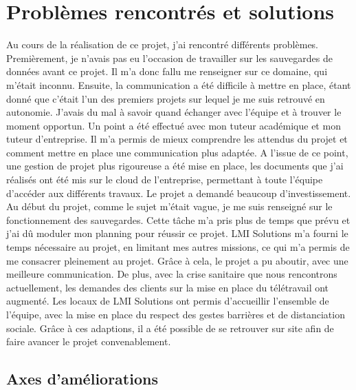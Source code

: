 \documentclass[pfe]{tnreport} %
\begin{document}
\clearpage

\chapter{Problèmes rencontrés et solutions}

Au cours de la réalisation de ce projet, j'ai rencontré différents problèmes. \newline
Premièrement, je n'avais pas eu l'occasion de travailler sur les sauvegardes de données avant ce projet. Il m'a donc fallu me renseigner sur ce domaine, qui m'était inconnu.
Ensuite, la communication a été difficile à mettre en place, étant donné que c'était l'un des premiers projets sur lequel je me suis retrouvé en autonomie. \newline
J'avais du mal à savoir quand échanger avec l'équipe et à trouver le moment opportun.
Un point a été effectué avec mon tuteur académique et mon tuteur d'entreprise. Il m'a permis de mieux comprendre les attendus du projet et comment mettre en place une communication plus adaptée. \newline
A l'issue de ce point, une gestion de projet plus rigoureuse a été mise en place, les documents que j'ai réalisés ont été mis sur le cloud de l'entreprise, permettant à toute l'équipe d'accéder aux différents travaux. \newline
Le projet a demandé beaucoup d'investissement. Au début du projet, comme le sujet m'était vague, je me suis renseigné sur le fonctionnement des sauvegardes. \newline
Cette tâche m'a pris plus de temps que prévu et j'ai dû moduler mon planning pour réussir ce projet. \newline
LMI Solutions m'a fourni le temps nécessaire au projet, en limitant mes autres missions, ce qui m'a permis de me consacrer pleinement au projet. \newline 
Grâce à cela, le projet a pu aboutir, avec une meilleure communication. \newline
De plus, avec la crise sanitaire que nous rencontrons actuellement, les demandes des clients sur la mise en place du télétravail ont augmenté. Les locaux de LMI Solutions ont permis d'accueillir l'ensemble de l'équipe, avec la mise en place du respect des gestes barrières et de distanciation sociale. Grâce à ces adaptions, il a été possible de se retrouver sur site afin de faire avancer le projet convenablement. \newpage

\section{Axes d'améliorations}
\end{document}
